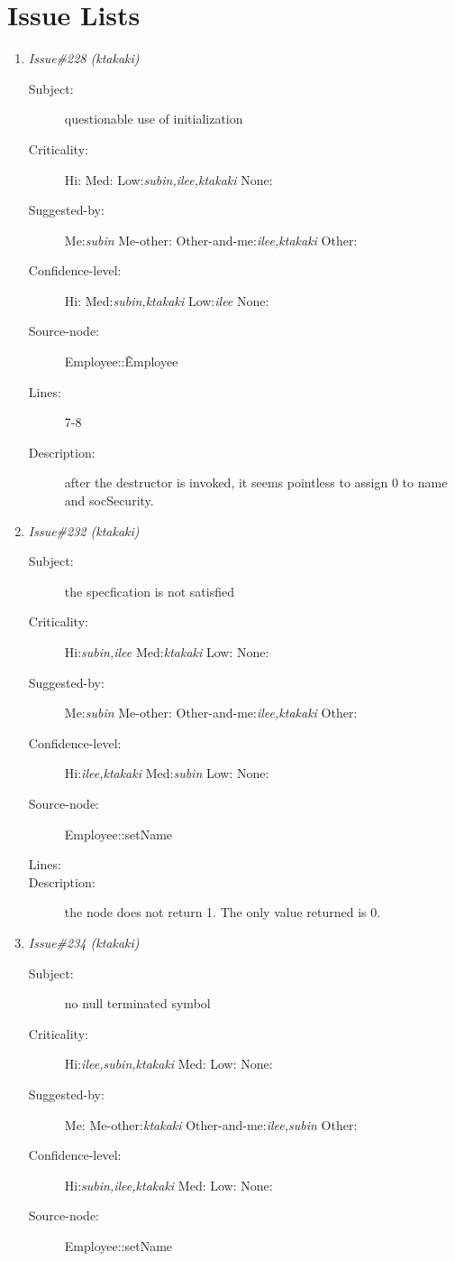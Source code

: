 \section{Issue Lists}
\begin{enumerate}
\item {\it Issue\#228 (ktakaki)}
\begin{description}
\item [Subject:] questionable use of initialization
\item [Criticality:] Hi:{\it } Med:{\it } Low:{\it subin,ilee,ktakaki} None:{\it }
\item [Suggested-by:] Me:{\it subin} Me-other:{\it } Other-and-me:{\it ilee,ktakaki} Other:{\it }
\item [Confidence-level:] Hi:{\it } Med:{\it subin,ktakaki} Low:{\it ilee} None:{\it }
\item [Source-node:] Employee::\~Employee

\item [Lines:] 7-8

\item [Description:] after the destructor is invoked, it seems 
pointless to assign 0 to name and socSecurity.
\end{description}
\item {\it Issue\#232 (ktakaki)}
\begin{description}
\item [Subject:] the specfication is not satisfied
\item [Criticality:] Hi:{\it subin,ilee} Med:{\it ktakaki} Low:{\it } None:{\it }
\item [Suggested-by:] Me:{\it subin} Me-other:{\it } Other-and-me:{\it ilee,ktakaki} Other:{\it }
\item [Confidence-level:] Hi:{\it ilee,ktakaki} Med:{\it subin} Low:{\it } None:{\it }
\item [Source-node:] Employee::setName

\item [Lines:] 

\item [Description:] the node does not return 1.  The only value 
returned is 0.
\end{description}
\item {\it Issue\#234 (ktakaki)}
\begin{description}
\item [Subject:] no null terminated symbol
\item [Criticality:] Hi:{\it ilee,subin,ktakaki} Med:{\it } Low:{\it } None:{\it }
\item [Suggested-by:] Me:{\it } Me-other:{\it ktakaki} Other-and-me:{\it ilee,subin} Other:{\it }
\item [Confidence-level:] Hi:{\it subin,ilee,ktakaki} Med:{\it } Low:{\it } None:{\it }
\item [Source-node:] Employee::setName


\end{description}
\end{enumerate}
